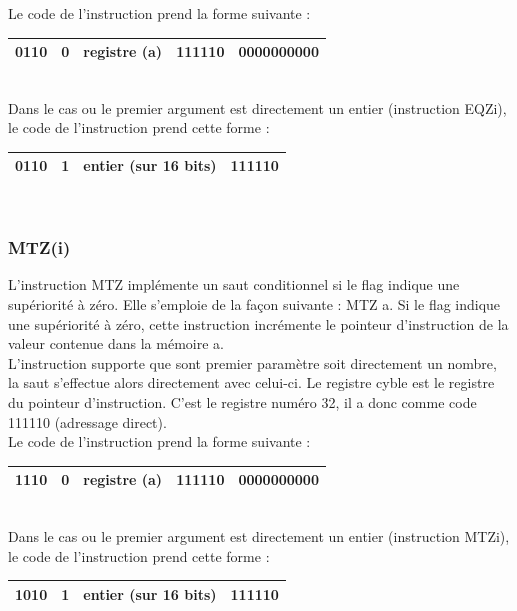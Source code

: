 \documentclass[a4paper, 12pt, twoside]{report}
\begin{document}
Le code de l'instruction prend la forme suivante :

\begin{tabular}{|c|c|c|c|c|}
  \hline
  0110 & 0 & registre (a) & 111110 & 0000000000 \\
  \hline
\end{tabular}\\

Dans le cas ou le premier argument est directement un entier (instruction EQZi),
le code de l'instruction prend cette forme :

\begin{tabular}{|c|c|c|c|}
  \hline
  0110 & 1 & entier (sur 16 bits) & 111110 \\
  \hline
\end{tabular}\\

\subsubsection{MTZ(i)}

L'instruction MTZ implémente un saut conditionnel si le flag indique une supériorité à zéro. 
Elle s'emploie de la façon suivante : MTZ a. Si le flag indique une supériorité à zéro, 
cette instruction incrémente le pointeur d'instruction de la valeur contenue dans 
la mémoire a.\\
L'instruction supporte que sont premier paramètre soit directement un nombre, la saut
s'effectue alors directement avec celui-ci. Le registre cyble est le registre du pointeur 
d'instruction. C'est le registre numéro 32, il a donc comme code 111110 (adressage direct).\\

Le code de l'instruction prend la forme suivante :

\begin{tabular}{|c|c|c|c|c|}
  \hline
  1110 & 0 & registre (a) & 111110 & 0000000000 \\
  \hline
\end{tabular}\\

Dans le cas ou le premier argument est directement un entier (instruction MTZi),
le code de l'instruction prend cette forme :

\begin{tabular}{|c|c|c|c|}
  \hline
  1010 & 1 & entier (sur 16 bits) & 111110 \\
  \hline
\end{tabular}\\
\end{document}
